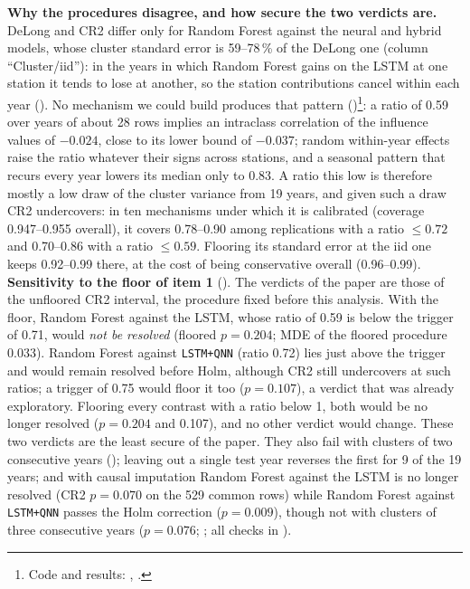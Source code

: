 \documentclass[11pt,a4paper]{article}
\begin{document}
\textbf{Why the procedures disagree, and how secure the two verdicts are.} DeLong and CR2 differ only for Random Forest against the neural and hybrid models, whose cluster standard error is 59--78\,\% of the DeLong one (column ``Cluster/iid''): in the years in which Random Forest gains on the LSTM at one station it tends to lose at another, so the station contributions cancel within each year (). No mechanism we could build produces that pattern ()\footnote{Code and results: , .}: a ratio of 0.59 over years of about 28 rows implies an intraclass correlation of the influence values of $-0.024$, close to its lower bound of $-0.037$; random within-year effects raise the ratio whatever their signs across stations, and a seasonal pattern that recurs every year lowers its median only to 0.83. A ratio this low is therefore mostly a low draw of the cluster variance from 19 years, and given such a draw CR2 undercovers: in ten mechanisms under which it is calibrated (coverage 0.947--0.955 overall), it covers 0.78--0.90 among replications with a ratio $\le0.72$ and 0.70--0.86 with a ratio $\le0.59$. Flooring its standard error at the iid one keeps 0.92--0.99 there, at the cost of being conservative overall (0.96--0.99). \textbf{Sensitivity to the floor of item 1} (). The verdicts of the paper are those of the unfloored CR2 interval, the procedure fixed before this analysis. With the floor, Random Forest against the LSTM, whose ratio of 0.59 is below the trigger of 0.71, would \emph{not be resolved} (floored $p=0.204$; MDE of the floored procedure 0.033). Random Forest against \texttt{LSTM+QNN} (ratio 0.72) lies just above the trigger and would remain resolved before Holm, although CR2 still undercovers at such ratios; a trigger of 0.75 would floor it too ($p=0.107$), a verdict that was already exploratory. Flooring every contrast with a ratio below 1, both would be no longer resolved ($p=0.204$ and 0.107), and no other verdict would change. These two verdicts are the least secure of the paper. They also fail with clusters of two consecutive years (); leaving out a single test year reverses the first for 9 of the 19 years; and with causal imputation Random Forest against the LSTM is no longer resolved (CR2 $p=0.070$ on the 529 common rows) while Random Forest against \texttt{LSTM+QNN} passes the Holm correction ($p=0.009$), though not with clusters of three consecutive years ($p=0.076$; ; all checks in ).
\end{document}
